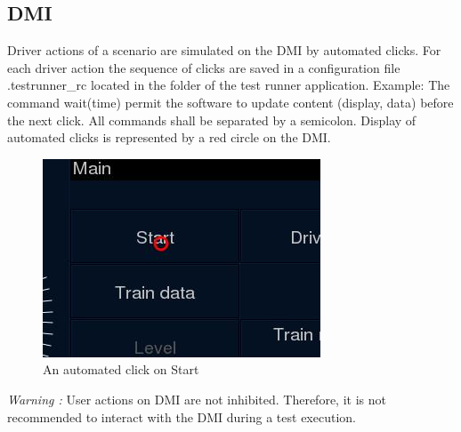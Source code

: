 \subsection{DMI}
Driver actions of a scenario are simulated on the DMI by automated clicks. For each driver action the sequence of clicks are saved in a configuration file .testrunner\_rc located in the folder of the test runner application.
\newline
\newline
Example:
\newline
{}
\newline
\newline
The command wait(time) permit the software to update content (display, data) before the next click. All commands shall be separated by a semicolon.
Display of automated clicks is represented by a red circle on the DMI.
\newline
\begin{figure}[h]
  \centering
  \includegraphics{image/test_runner_auto_click.jpg}
  \caption{An automated click on Start}
  \label{fig:An automated click on Start}
\end{figure}

\emph{Warning :} User actions on DMI are not inhibited. Therefore, it is not recommended to interact with the DMI during a test execution.

